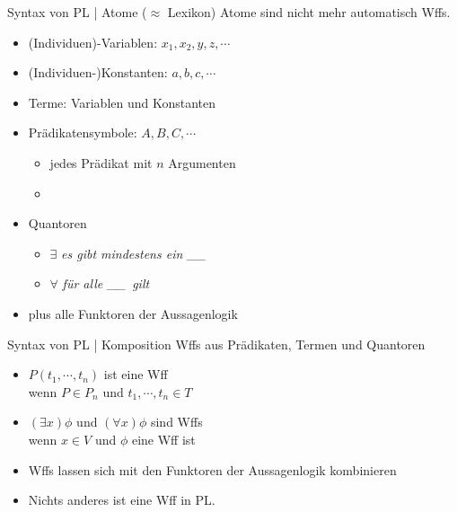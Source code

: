 \begin{frame}
  {Syntax von PL | Atome ($\approx$ Lexikon)}
  \onslide<+->
  \onslide<+->
  Atome sind nicht mehr automatisch Wffs.\\
  \Halbzeile
  \begin{itemize}[<+->]
    \item \alert{(Individuen)-Variablen}: $x_1, x_2, y, z, \cdots$ 
    \item \alert{(Individuen-)Konstanten}: $a, b, c, \cdots$ 
    \item \alert{Terme}: Variablen und Konstanten 
    \item \alert{Prädikatensymbole}: $A, B, C, \cdots$
      \begin{itemize}[<+->]
        \item jedes Prädikat mit $n$ Argumenten 
        \item {}
      \end{itemize}
    \item \alert{Quantoren}
      \begin{itemize}[<+->]
        \item $\exists$ \textit{es gibt mindestens ein \_\_}
        \item $\forall$ \textit{für alle \_\_\ gilt}
      \end{itemize}
    \item plus alle \alert{Funktoren} der Aussagenlogik
  \end{itemize}
\end{frame}

\begin{frame}
  {Syntax von PL | Komposition}
  \onslide<+->
  \onslide<+->
  Wffs aus Prädikaten, Termen und Quantoren\\
  \Halbzeile
  \begin{itemize}[<+->]
    \item \alert{$P(t_1,\cdots,t_n)$} ist eine Wff\\
      wenn \alert{$P\in P_n$} und \alert{$t_1,\cdots,t_n\in T$}
      \Halbzeile
    \item \alert{$(\exists x)\phi$} und \alert{$(\forall x)\phi$} sind Wffs\\
      wenn \alert{$x\in V$} und \alert{$\phi$ eine Wff} ist
      \Halbzeile
    \item Wffs lassen sich mit den Funktoren der Aussagenlogik kombinieren
      \Halbzeile
    \item Nichts anderes ist eine Wff in PL.\\
  \end{itemize}
\end{frame}

